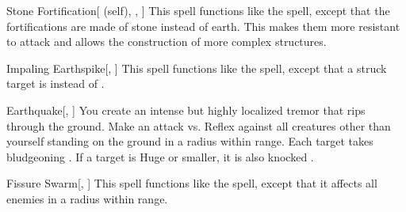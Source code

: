 \lowercase{\hypertarget{spell:Stone Fortification}{}}\label{spell:Stone Fortification}
\begin{attuneability}[\nth{3}]{\hypertarget{spell:Stone Fortification}{Stone Fortification}}[ (self), , ]
This spell functions like the  spell, except that the fortifications are made of stone instead of earth.
This makes them more resistant to attack and allows the construction of more complex structures.
\end{attuneability}
\vspace{0.25em}



\lowercase{\hypertarget{spell:Impaling Earthspike}{}}\label{spell:Impaling Earthspike}
\begin{apability}[\nth{4}]{\hypertarget{spell:Impaling Earthspike}{Impaling Earthspike}}[, ]
This spell functions like the  spell, except that a struck target is  instead of .
\end{apability}
\vspace{0.25em}



\lowercase{\hypertarget{spell:Earthquake}{}}\label{spell:Earthquake}
\begin{apability}[\nth{5}]{\hypertarget{spell:Earthquake}{Earthquake}}[, ]
You create an intense but highly localized tremor that rips through the ground.
Make an attack vs. Reflex against all creatures other than yourself standing on the ground in a \arealarge radius within \rnglong range.
\hit Each target takes bludgeoning .
If a target is Huge or smaller, it is also knocked .
\end{apability}
\vspace{0.25em}



\lowercase{\hypertarget{spell:Fissure Swarm}{}}\label{spell:Fissure Swarm}
\begin{apability}[\nth{6}]{\hypertarget{spell:Fissure Swarm}{Fissure Swarm}}[, ]
This spell functions like the  spell, except that it affects all enemies in a \areamed radius within \rngmed range.
\end{apability}
\vspace{0.25em}


